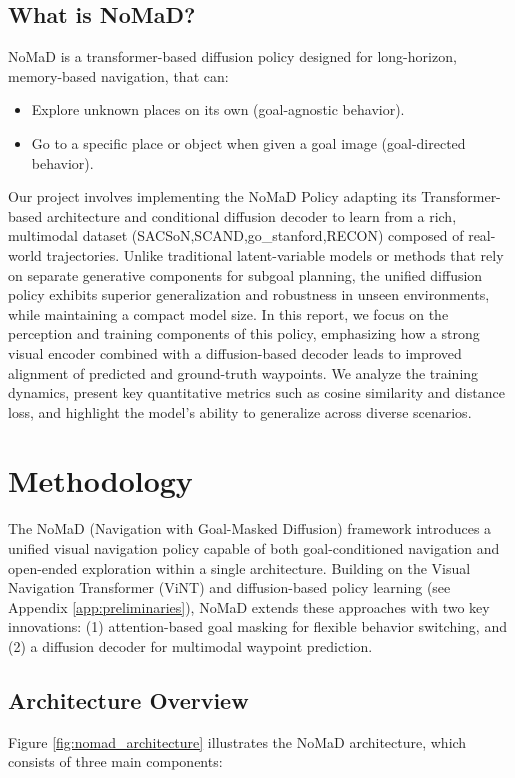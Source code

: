\documentclass[12pt]{article}
\begin{document}
\subsection*{What is NoMaD?}
NoMaD is a transformer-based diffusion policy designed for long-horizon, memory-based navigation, that can:
\begin{itemize}
    \item Explore unknown places on its own (goal-agnostic behavior).
    \item Go to a specific place or object when given a goal image (goal-directed behavior).
\end{itemize}
Our project involves implementing the NoMaD Policy adapting its Transformer-based architecture and conditional diffusion decoder
to learn from a rich, multimodal dataset (SACSoN,SCAND,go\_stanford,RECON) composed of real-world trajectories.
Unlike traditional latent-variable models or methods that rely on separate generative components for subgoal planning, the unified diffusion policy exhibits superior generalization and robustness in unseen environments, while maintaining a compact model size.
In this report, we focus on the perception and training components of this policy, emphasizing how a strong visual encoder combined with a diffusion-based decoder leads to improved alignment of predicted and ground-truth waypoints. We analyze the training dynamics, present key quantitative metrics such as cosine similarity and distance loss, and highlight the model's ability to generalize across diverse scenarios.

\section{Methodology}
The NoMaD (Navigation with Goal-Masked Diffusion) framework introduces a unified visual navigation policy capable of both goal-conditioned navigation and open-ended exploration within a single architecture. Building on the Visual Navigation Transformer (ViNT) \cite{vint} and diffusion-based policy learning (see Appendix \ref{app:preliminaries}), NoMaD extends these approaches with two key innovations: (1) attention-based goal masking for flexible behavior switching, and (2) a diffusion decoder for multimodal waypoint prediction.
\subsection*{Architecture Overview}
\label{subsec:architecture}
Figure \ref{fig:nomad_architecture} illustrates the NoMaD architecture, which consists of three main components:
\end{document}
